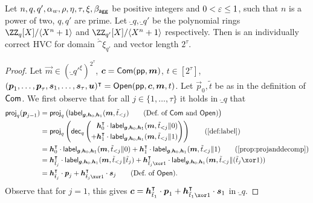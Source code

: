 \begin{lemma}\label{lem:veccomcorrectness}
  Let $n,q,q',\alpha_w,\rho,\eta,\tau,\xi,\beta_{\mathsf{agg}}$ be positive integers and $0 < \varepsilon \leq 1$, such that $n$ is a power of two, $q,q'$ are prime.
  Let $\ring_q,\ring_{q'}$ be the polynomial rings $\defringq$ and $\defringqq$ respectively.
  Then \eprint{$\hvcplain$}\cameraready{$\hvccamera$} is an individually correct HVC for domain $\ring^\xi_{q'}$ and vector length $2^\tau$.
\end{lemma}
\begin{proof}
Let $\vec{m} \in (\ring_{q'}^{\xi})^{2^\tau}$, $\boldsymbol{c} = \mathsf{Com}(\mathsf{pp},\boldsymbol{m})$, $t\in[2^\tau]$, $(\boldsymbol{p}_1,\dots,\boldsymbol{p}_{\tau},\boldsymbol{s}_1, \dots, \boldsymbol{s}_{\tau},\boldsymbol{u})^\intercal = \mathsf{Open}(\mathsf{pp},\boldsymbol{c},\boldsymbol{m},t)$. Let $\vec{p}_{0}, \tilde{t}$ be as in the definition of $\mathsf{Com}$.
We first observe that for all $j\in\{1,\ldots,\tau\}$ it holds in $\ring_q$ that
\begin{align*}
  \projmod{q}(\vec{p}_{j-1})
  ={}&\projmod{q}\left(\lbl_{\vec{g},\vec{h}_0,\vec{h}_1}(\vec{m},\tilde t_{< j})\tag{Def.\ of $\commit$ and $\open$}\right)\\
  ={}&\projmod{q}\left(\decompmod{q}\left(
      \begin{aligned}
        &\vec{h}_0^\transpose \cdot\lbl_{\vec{g},\vec{h}_0,\vec{h}_1}(\vec{m},\tilde t_{< j}\Vert 0)\\
        {}+ &\vec{h}_1^\transpose \cdot\lbl_{\vec{g},\vec{h}_0,\vec{h}_1}(\vec{m},\tilde t_{< j}\Vert 1)
      \end{aligned}
    \right)\right)\tag{\autoref{def:label}}\\
  ={}&\vec{h}_0^\transpose \cdot\lbl_{\vec{g},\vec{h}_0,\vec{h}_1}(\vec{m},\tilde t_{< j}\Vert 0) + \vec{h}_1^\transpose \cdot\lbl_{\vec{g},\vec{h}_0,\vec{h}_1}(\vec{m},\tilde t_{< j}\Vert 1)\tag{\autoref{prop:projanddecomp}}\\
  ={}&\vec{h}_{\tilde t_{j}}^\transpose \cdot\lbl_{\vec{g},\vec{h}_0,\vec{h}_1}(\vec{m},\tilde t_{< j}\Vert \tilde t_{j}) + \vec{h}_{\tilde t_{j}\xor 1}^\transpose \cdot\lbl_{\vec{g},\vec{h}_0,\vec{h}_1}(\vec{m},\tilde t_{< j}\Vert (\tilde t_{j}\xor 1))\\
  ={}&\vec{h}_{\tilde t_{j}}^\transpose \cdot\vec{p}_{j} + \vec{h}_{\tilde t_{j}\xor 1}^\transpose \cdot\vec{s}_{j}\tag{Def.\ of $\open$}.
\end{align*}
Observe that for $j=1$, this gives $\vec{c} = \vec{h}_{\tilde t_1}^\transpose\cdot \vec{p}_{1} + \vec{h}_{\tilde t_1 \xor 1}^\transpose \cdot \vec{s}_{1}$ in $\ring_q$.

\end{proof}
